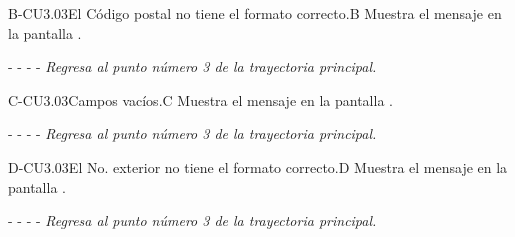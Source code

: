    
	\begin{UCtrayectoriaA}{B-CU3.03}{El Código postal no tiene el formato correcto.}{B}
			\UCpaso[\UCsist] Muestra el mensaje  en la pantalla .
			\item[- -] - - {\em Regresa al punto número 3 de la trayectoria principal.} 
    \end{UCtrayectoriaA}
	\begin{UCtrayectoriaA}{C-CU3.03}{Campos vacíos.}{C}
	   	\UCpaso[\UCsist]Muestra el mensaje en la pantalla .
	    
	    \item[- -] - - {\em Regresa al punto número 3 de la trayectoria principal.}
	\end{UCtrayectoriaA}

    


    	
	\begin{UCtrayectoriaA}{D-CU3.03}{El No. exterior no tiene el formato correcto.}{D}
			\UCpaso[\UCsist] Muestra el mensaje  en la pantalla .
			\item[- -] - - {\em Regresa al punto número 3 de la trayectoria principal.} 
    \end{UCtrayectoriaA}
